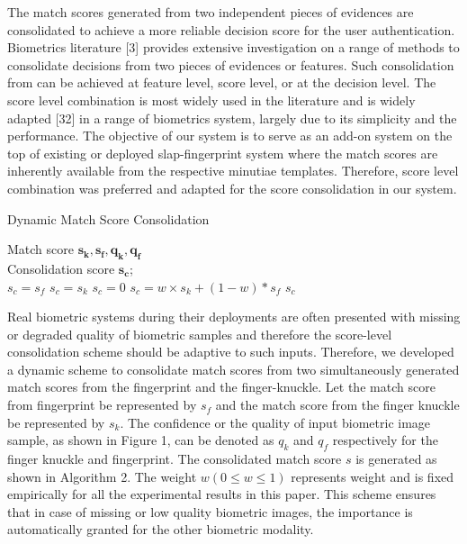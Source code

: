 The match scores generated from two independent pieces of evidences are consolidated to achieve a more reliable decision score for the user authentication. Biometrics literature [3] provides extensive investigation on a range of methods to consolidate decisions from two pieces of evidences or features. Such consolidation from can be achieved at feature level, score level, or at the decision level. The score level combination is most widely used in the literature and is widely adapted [32] in a range of biometrics system, largely due to its simplicity and the performance. The objective of our system is to serve as an add-on system on the top of existing or deployed slap-fingerprint system where the match scores are inherently available from the respective minutiae templates. Therefore, score level combination was preferred and adapted for the score consolidation in our system.  
\begin{algorithm}[h!]
    \renewcommand{\algorithmicrequire}{\textbf{Input:}}
    \renewcommand{\algorithmicensure}{\textbf{Output:}}
    \caption{Dynamic Match Score Consolidation}
    \begin{algorithmic}[1]
        \REQUIRE Match score $\bm{s_k, s_f, q_k, q_f}$ \\ 
        \ENSURE Consolidation score $\bm{s_c}$;\\
            \STATE $s_c = s_f$
        \ENDIF
            \STATE $s_c = s_k$
        \ENDIF
            \STATE $s_c = 0$
        \ELSE
            \STATE $s_c = w \times s_k + (1-w)*s_f$
        \ENDIF
        \RETURN $s_c$
    \end{algorithmic}
\end{algorithm}

Real biometric systems during their deployments are often presented with missing or degraded quality of biometric samples and therefore the score-level consolidation scheme should be adaptive to such inputs. Therefore, we developed a dynamic scheme to consolidate match scores from two simultaneously generated match scores from the fingerprint and the finger-knuckle. Let the match score from fingerprint be represented by $s_f$ and the match score from the finger knuckle be represented by $s_k$. The confidence or the quality of input biometric image sample, as shown in Figure 1, can be denoted as $q_k$ and $q_f$ respectively for the finger knuckle and fingerprint. The consolidated match score $s$ is generated as shown in Algorithm 2. The weight $w ( 0 \leq w \leq 1)$  represents weight and is fixed empirically for all the experimental results in this paper. This scheme ensures that in case of missing or low quality biometric images, the importance is automatically granted for the other biometric modality.  

